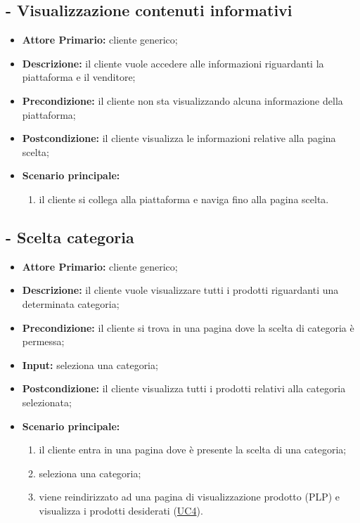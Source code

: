 \resetCUC

\stepUserCase
\subsection{ - Visualizzazione contenuti informativi}
\begin{itemize}
    \item \textbf{Attore Primario:} cliente generico;
    \item \textbf{Descrizione:} il cliente vuole accedere alle informazioni riguardanti la piattaforma e il venditore;
    \item \textbf{Precondizione:} il cliente non sta visualizzando alcuna informazione della piattaforma;
    \item \textbf{Postcondizione:} il cliente visualizza le informazioni relative alla pagina scelta;
    \item \textbf{Scenario principale:}
    \begin{enumerate}
        \item il cliente si collega alla piattaforma e naviga fino alla pagina scelta.
    \end{enumerate}
\end{itemize}

\stepUserCase
\subsection{ - Scelta categoria}
\begin{itemize}
    \item \textbf{Attore Primario:} cliente generico;
    \item \textbf{Descrizione:} il cliente vuole visualizzare tutti i prodotti riguardanti una determinata categoria;
    \item \textbf{Precondizione:} il cliente si trova in una pagina dove la scelta di categoria è permessa;
    \item \textbf{Input:} seleziona una categoria;
    \item \textbf{Postcondizione:} il cliente visualizza tutti i prodotti relativi alla categoria selezionata;
    \item \textbf{Scenario principale:}
    \begin{enumerate}
        \item il cliente entra in una pagina dove è presente la scelta di una categoria;
        \item seleziona una categoria;
        \item viene reindirizzato ad una pagina di visualizzazione prodotto (PLP) e visualizza i prodotti desiderati (\hyperref[UC4]{UC4}).
    \end{enumerate}
\end{itemize}

